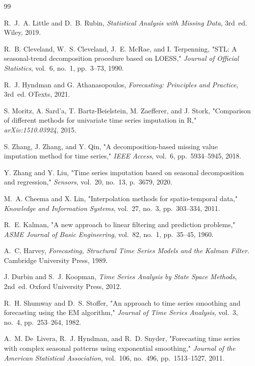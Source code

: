 \begin{thebibliography}{99}

R.~J.~A. Little and D.~B. Rubin, \emph{Statistical Analysis with Missing Data}, 3rd~ed. Wiley, 2019.

R.~B. Cleveland, W.~S. Cleveland, J.~E. McRae, and I. Terpenning, "STL: A seasonal-trend decomposition procedure based on LOESS," \emph{Journal of Official Statistics}, vol.~6, no.~1, pp.~3--73, 1990.

R.~J. Hyndman and G. Athanasopoulos, \emph{Forecasting: Principles and Practice}, 3rd~ed. OTexts, 2021.

S. Moritz, A. Sard'a, T. Bartz-Beielstein, M. Zaefferer, and J. Stork, "Comparison of different methods for univariate time series imputation in R," \emph{arXiv:1510.03924}, 2015.

S. Zhang, J. Zhang, and Y. Qin, "A decomposition-based missing value imputation method for time series," \emph{IEEE Access}, vol.~6, pp.~5934--5945, 2018.

Y. Zhang and Y. Liu, "Time series imputation based on seasonal decomposition and regression," \emph{Sensors}, vol.~20, no.~13, p.~3679, 2020.

M.~A. Cheema and X. Lin, "Interpolation methods for spatio-temporal data," \emph{Knowledge and Information Systems}, vol.~27, no.~3, pp.~303--334, 2011.

R.~E. Kalman, "A new approach to linear filtering and prediction problems," \emph{ASME Journal of Basic Engineering}, vol.~82, no.~1, pp.~35--45, 1960.

A.~C. Harvey, \emph{Forecasting, Structural Time Series Models and the Kalman Filter}. Cambridge University Press, 1989.

J. Durbin and S.~J. Koopman, \emph{Time Series Analysis by State Space Methods}, 2nd~ed. Oxford University Press, 2012.

R.~H. Shumway and D.~S. Stoffer, "An approach to time series smoothing and forecasting using the EM algorithm," \emph{Journal of Time Series Analysis}, vol.~3, no.~4, pp.~253--264, 1982.

A.~M. De~Livera, R.~J. Hyndman, and R.~D. Snyder, "Forecasting time series with complex seasonal patterns using exponential smoothing," \emph{Journal of the American Statistical Association}, vol.~106, no.~496, pp.~1513--1527, 2011.


\end{thebibliography}
